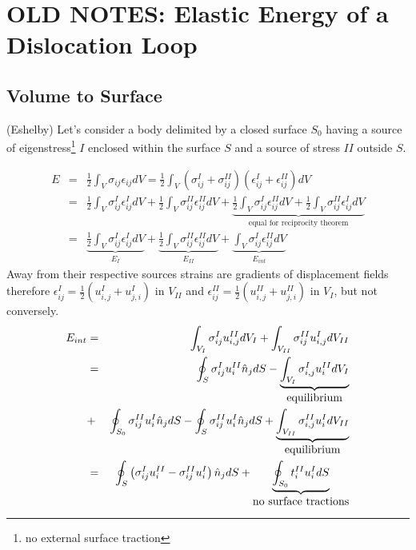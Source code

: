    
   

\section{OLD NOTES: Elastic Energy of a Dislocation Loop}
\subsection{Volume to Surface}
(Eshelby) Let's consider a body delimited by a closed surface $S_0$ having a source of eigenstress\footnote{ no external surface traction}  $I$ enclosed within the surface $S$ and a source of stress $II$ outside $S$.


\begin{eqnarray}
E&=&\frac{1}{2}\int_V\sigma_{ij}\epsilon_{ij}dV=\frac{1}{2}\int_V\left(\sigma^I_{ij}+\sigma^{II}_{ij}\right)\left(\epsilon^I_{ij}+\epsilon^{II}_{ij}\right)dV\nonumber\\
&=&\frac{1}{2}\int_V\sigma^I_{ij}\epsilon^{I}_{ij}dV+\frac{1}{2}\int_V\sigma^{II}_{ij}\epsilon^{II}_{ij}dV+\underbrace{\frac{1}{2}\int_V\sigma^{I}_{ij}\epsilon^{II}_{ij}dV+\frac{1}{2}\int_V\sigma^{II}_{ij}\epsilon^{I}_{ij}dV}_{\mbox{equal for reciprocity theorem}}\nonumber\\
&=&\underbrace{\frac{1}{2}\int_V\sigma^I_{ij}\epsilon^{I}_{ij}dV}_{E_I}+\underbrace{\frac{1}{2}\int_V\sigma^{II}_{ij}\epsilon^{II}_{ij}dV}_{E_{II}}+\underbrace{\int_V\sigma^{I}_{ij}\epsilon^{II}_{ij}dV}_{E_{int}}
\end{eqnarray}
Away from their respective sources strains are gradients of displacement fields therefore $\epsilon^{I}_{ij}=\frac{1}{2}\left(u^I_{i,j}+u^I_{j,i}\right)$ in $V_{II}$ and $\epsilon^{II}_{ij}=\frac{1}{2}\left(u^{II}_{i,j}+u^{II}_{j,i}\right)$ in $V_{I}$, but not conversely.
\begin{eqnarray}
E_{int}&=&\int_{V_I}\sigma^{I}_{ij}u^{II}_{i,j}dV_I+\int_{V_{II}}\sigma^{II}_{ij}u^{I}_{i,j}dV_{II}\noindent\\
&=&\oint_{S}\sigma^{I}_{ij}u^{II}_{i}\hat{n}_jdS-\underbrace{\int_{V_I}\sigma^{I}_{i,j}u^{II}_{i}dV_I}_{\mbox{equilibrium}}\nonumber\\
&+&\oint_{S_0}\sigma^{II}_{ij}u^{I}_{i}\hat{n}_jdS-\oint_{S}\sigma^{II}_{ij}u^{I}_{i}\hat{n}_jdS+\underbrace{\int_{V_{II}}\sigma^{II}_{i,j}u^{I}_{i}dV_{II}}_{\mbox{equilibrium}}\nonumber\\
&=&\oint_{S}\left(\sigma^{I}_{ij}u^{II}_{i}-\sigma^{II}_{ij}u^{I}_{i}\right)\hat{n}_jdS+\underbrace{\oint_{S_0}t_i^{II}u_i^{I}dS}_{\mbox{no surface tractions}}
\end{eqnarray}


